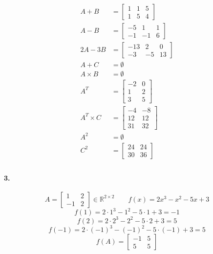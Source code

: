 \documentclass[12pt,a4paper,fleqn]{article}
\newcommand{\myparagraph}[1]{\paragraph{#1}\mbox{}}
\begin{document}
\begin{align*}
  A + B &=
  \begin{bmatrix}
    1 & 1 & 5 \\
    1 & 5 & 4
  \end{bmatrix} \\
  A - B &=
  \begin{bmatrix}
    -5 & 1 & 1 \\
    -1 & -1 & 6
  \end{bmatrix} \\
  2A - 3B &=
  \begin{bmatrix}
    -13 & 2  & 0 \\
    -3  & -5 & 13
  \end{bmatrix} \\
  A + C &= \emptyset \\
  A \times B &= \emptyset \\
  A^{T} &=
  \begin{bmatrix}
    -2 & 0 \\
    1 & 2 \\
    3 & 5
  \end{bmatrix} \\
  A^T \times C &=
  \begin{bmatrix}
    -4 & -8 \\
    12 & 12 \\
    31 & 32
  \end{bmatrix} \\
  A^2 &= \emptyset \\
  C^2 &=
  \begin{bmatrix}
    24 & 24 \\
    30 & 36
  \end{bmatrix} \\
\end{align*}


\myparagraph{3.}
\[
  A = \begin{bmatrix} 1 & 2 \\ -1 & 2 \end{bmatrix} \in \mathbb{R}^{2 \times 2}
  \qquad
  f(x) = 2x^3 - x^2 - 5x + 3
\]
\[ f(1) = 2 \cdot 1^3 - 1^2 - 5 \cdot 1 + 3 = -1 \]
\[ f(2) = 2 \cdot 2^3 - 2^2 - 5 \cdot 2 + 3 = 5 \]
\[ f(-1) = 2 \cdot (-1)^3 - (-1)^2 - 5 \cdot (-1  ) + 3 = 5 \]
\[ f(A) = \begin{bmatrix} -1 & 5 \\ 5 & 5 \end{bmatrix} \]
\end{document}
